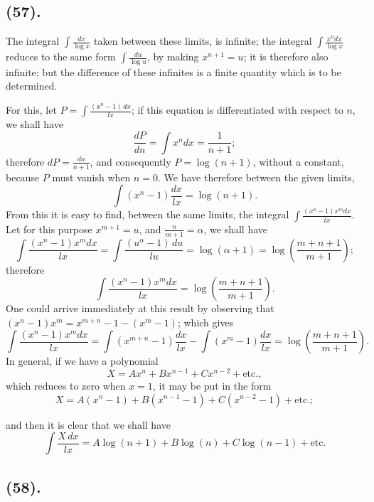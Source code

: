 \documentclass{article}
\begin{document}
\subsection*{(57).}

The integral $\displaystyle\int\frac{dx}{\log x}$ taken between these limits, is infinite; the integral $\displaystyle\int\frac{x^{n}dx}{\log x}$ reduces to the same form $\displaystyle\int\frac{du}{\log u}$, by making $x^{n+1}=u$; it is therefore also infinite; but the difference of these infinites is a finite quantity which is to be determined.

For this, let $\displaystyle P=\int\frac{(x^{n}-1)\,dx}{lx}$; if this equation is differentiated with respect to $n$, we shall have
\[ \frac{dP}{dn}=\int x^{n}dx=\frac{1}{n+1}; \]
therefore $dP=\frac{dn}{n+1}$, and consequently $P=\log(n+1)$, without a constant, because $P$ must vanish when $n=0$. We have therefore between the given limits,
\[ \int(x^{n}-1)\frac{dx}{lx}=\log(n+1). \tag{1} \]
From this it is easy to find, between the same limits, the integral $\displaystyle\int\frac{(x^{n}-1)x^{m}dx}{lx}$. Let for this purpose $x^{m+1}=u$, and $\frac{n}{m+1}=\alpha$, we shall have
\[ \int\frac{(x^{n}-1)x^{m}dx}{lx}=\int\frac{(u^{\alpha}-1)\,du}{lu}=\log(\alpha+1)=\log\left(\frac{m+n+1}{m+1}\right); \]
therefore
\[ \int\frac{(x^{n}-1)x^{m}dx}{lx}=\log\left(\frac{m+n+1}{m+1}\right). \tag{2} \]
One could arrive immediately at this result by observing that $(x^{n}-1)x^{m}=x^{m+n}-1-(x^{m}-1)$; which gives
\[ \int\frac{(x^{n}-1)x^{m}dx}{lx}=\int(x^{m+n}-1)\frac{dx}{lx}-\int(x^{m}-1)\frac{dx}{lx}=\log\left(\frac{m+n+1}{m+1}\right). \]
In general, if we have a polynomial
\[ X=Ax^{n}+Bx^{n-1}+Cx^{n-2}+\text{etc.}, \]
which reduces to zero when $x=1$, it may be put in the form
\[ X=A(x^{n}-1)+B(x^{n-1}-1)+C(x^{n-2}-1)+\text{etc.}; \]

and then it is clear that we shall have
\[ \int\frac{X\,dx}{lx}=A\log(n+1)+B\log(n)+C\log(n-1)+\text{etc.} \]

\subsection*{(58).}
\end{document}
